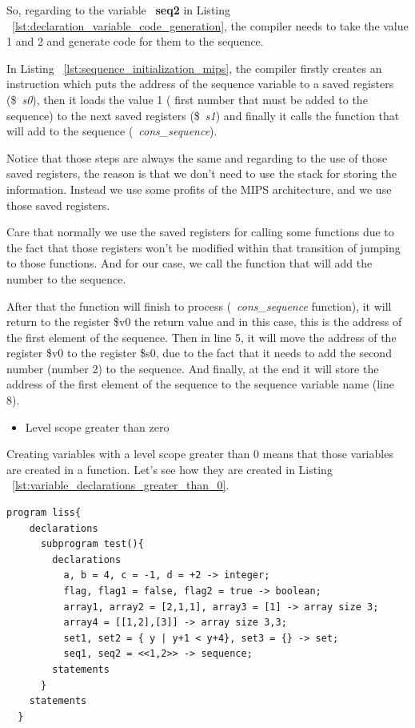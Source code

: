 \documentclass[
  oneside,
  11pt, a4paper,
  footinclude=true,
  headinclude=true,
  cleardoublepage=empty
]{scrbook}
\begin{document}
So, regarding to the variable ~\textbf{seq2} in Listing ~\ref{lst:declaration_variable_code_generation}, the compiler needs to take the value 1 and 2 and generate code for them to the sequence.

In Listing ~\ref{lst:sequence_initialization_mips}, the compiler firstly creates an instruction which puts the address of the sequence variable to a saved registers (\$~\textit{s0}), then it loads the value 1 ( first number that must be added to the sequence) to the next saved registers (\$~\textit{s1}) and finally it calls the function that will add to the sequence (~\textit{cons\_sequence}).

Notice that those steps are always the same and regarding to the use of those saved registers, the reason is that we don't need to use the stack for storing the information. Instead we use some profits of the MIPS architecture, and we use those saved registers. 

Care that normally we use the saved registers for calling some functions due to the fact that those registers won't be modified within that transition of jumping to those functions. And for our case, we call the function that will add the number to the sequence.

After that the function will finish to process (~\textit{cons\_sequence} function), it will return to the register \$v0 the return value and in this case, this is the address of the first element of the sequence. Then in line 5, it will move the address of the register \$v0 to the register \$s0, due to the fact that it needs to add the second number (number 2) to the sequence. And finally, at the end it will store the address of the first element of the sequence to the sequence variable name (line 8).

\begin{itemize}
\item Level scope greater than zero
\end{itemize}

Creating variables with a level scope greater than 0 means that those variables are created in a function.
Let's see how they are created in Listing ~\ref{lst:variable_declarations_greater_than_0}.

\begin{lstlisting}[caption={Example of creating variables in a level scope greater than 0},label={lst:variable_declarations_greater_than_0}]
  program liss{
    declarations
      subprogram test(){
        declarations
          a, b = 4, c = -1, d = +2 -> integer;
          flag, flag1 = false, flag2 = true -> boolean;
          array1, array2 = [2,1,1], array3 = [1] -> array size 3;
          array4 = [[1,2],[3]] -> array size 3,3;
          set1, set2 = { y | y+1 < y+4}, set3 = {} -> set;
          seq1, seq2 = <<1,2>> -> sequence;
        statements
      }
    statements
  }
\end{lstlisting}
\end{document}
